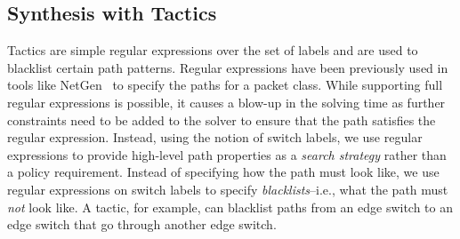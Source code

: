 \subsection{Synthesis with Tactics}
Tactics are simple regular expressions over the set
 of labels and are used to blacklist certain path patterns.
Regular expressions have been previously used in tools like
NetGen~\cite{netgen} to specify the paths for a packet class.
While supporting full regular expressions is possible, it causes a blow-up in the solving time as further
constraints need to be added to the solver to ensure that the path satisfies the regular expression. 
Instead, using the notion of switch labels, we use regular expressions to provide high-level path properties as a {\em search strategy} rather than a policy requirement. 
Instead of specifying how the path must look like, we use regular expressions on switch labels to specify \emph{blacklists}--i.e.,
what the path must \emph{not} look like. A tactic, for example, can blacklist paths from an edge switch to an edge switch that go through another edge switch. 

